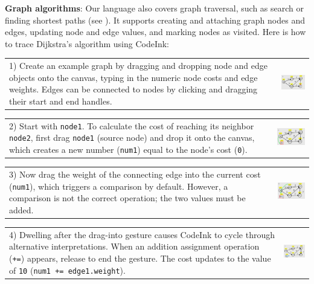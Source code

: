\noindent \textbf{Graph algorithms}: Our language also covers graph
traversal, such as search or finding shortest paths (see
). It supports creating and attaching graph
nodes and edges, updating node and edge values, and marking nodes as
visited. Here is how to trace Dijkstra's algorithm using CodeInk:

\noindent \begin{tabular}{m{4.2cm} m{3.8cm}}
1) Create an example graph by dragging and dropping node and edge
objects onto the canvas, typing in the numeric node costs and edge weights.
Edges can be connected to nodes by clicking and dragging their start and end
handles.
& \includegraphics[width=3.8cm]{img/examples/dijkstra-1.png}
\end{tabular}

\noindent \begin{tabular}{m{4.2cm} m{3.8cm}}
2) Start with \texttt{node1}. To calculate the
cost of reaching its neighbor \texttt{node2},
first drag \texttt{node1} (source node) and drop it onto the canvas, which
creates a new number (\texttt{num1}) equal to the node's cost (\texttt{0}).
& \includegraphics[width=3.8cm]{img/examples/dijkstra-2.png}
\end{tabular}

\noindent \begin{tabular}{m{4.2cm} m{3.8cm}}
3) Now drag the weight of the connecting edge into the current cost
(\texttt{num1}), which triggers a comparison by default. However, a
comparison is not the correct operation; the two values
must be added.
& \includegraphics[width=3.8cm]{img/examples/dijkstra-3.png}
\end{tabular}

\noindent \begin{tabular}{m{4.2cm} m{3.8cm}}
4) Dwelling after the drag-into gesture causes CodeInk to cycle through alternative
interpretations. When an addition assignment
operation (\texttt{+=}) appears, release to end the gesture. The cost
updates to the value of \texttt{10} (\texttt{num1 += edge1.weight}).
& \includegraphics[width=3.8cm]{img/examples/dijkstra-4.png}
\end{tabular}

